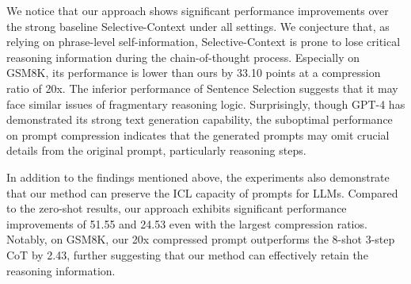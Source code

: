 We notice that our approach shows significant performance improvements over the strong baseline Selective-Context under all settings. 
We conjecture that,
as relying on phrase-level self-information, Selective-Context is prone to lose critical reasoning information during the chain-of-thought process. 
Especially on GSM8K, its performance is lower than ours by 33.10 points at a compression ratio of 20x. %
The inferior performance of Sentence Selection suggests that it may face similar issues of fragmentary reasoning logic.
Surprisingly, though GPT-4 has demonstrated its strong text generation capability, the suboptimal performance on prompt compression indicates that the generated prompts may omit crucial details from the original prompt, particularly reasoning steps. 

In addition to the findings mentioned above,
the experiments also demonstrate that our method can preserve the ICL capacity of prompts for LLMs.
Compared to the zero-shot results, our approach exhibits significant performance improvements of 51.55 and 24.53 even with the largest compression ratios.
Notably, on GSM8K, our 20x compressed prompt outperforms the 8-shot 3-step CoT by 2.43, further suggesting that our method can effectively retain the reasoning information.



